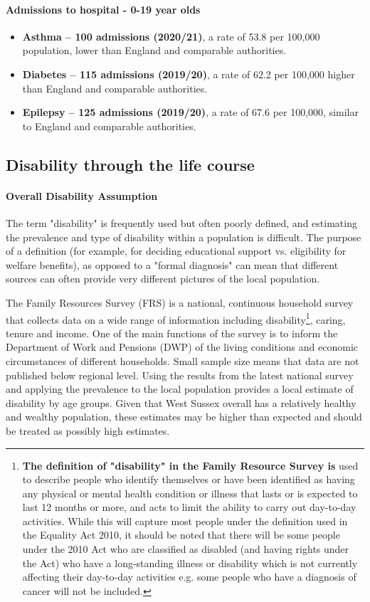 \paragraph{Admissions to hospital - 0-19 year olds}
\begin{itemize}[noitemsep]
    \item {\bfseries Asthma -- 100 admissions (2020/21)}, a rate of 53.8 per 100,000 population, lower than England and comparable authorities.
    \item {\bfseries Diabetes -- 115 admissions (2019/20)}, a rate of 62.2 per 100,000 higher than England and comparable authorities.
    \item {\bfseries Epilepsy -- 125 admissions (2019/20)}, a rate of 67.6 per 100,000, similar to England and comparable authorities.
\end{itemize}

\subsection{Disability through the life course}
\paragraph{Overall Disability Assumption} The term "disability" is frequently used but often poorly defined, and estimating the prevalence and type of disability within a population is difficult. The purpose of a definition (for example, for deciding educational support vs. eligibility for welfare benefits), as opposed to a "formal diagnosis" can mean that different sources can often provide very different pictures of the local population.

The Family Resources Survey (FRS) is a national, continuous household survey that collects data on a wide range of information including disability\footnote{{\bf The definition of "disability" in the Family Resource Survey is} used to describe people who identify themselves or have been identified as having any physical or mental health condition or illness that lasts or is expected to last 12 months or more, and acts to limit the ability to carry out day-to-day activities. While this will capture most people under the definition used in the Equality Act 2010, it should be noted that there will be some people under the 2010 Act who are classified as disabled (and having rights under the Act) who have a long-standing illness or disability which is not currently affecting their day-to-day activities e.g. some people who have a diagnosis of cancer will not be included.}, caring, tenure and income. One of the main functions of the survey is to inform the Department of Work and Pensions (DWP) of the living conditions and economic circumstances of different households. Small sample size means that data are not published below regional level. Using the results from the latest national survey and applying the prevalence to the local population provides a local estimate of disability by age groups. Given that West Sussex overall has a relatively healthy and wealthy population, these estimates may be higher than expected and should be treated as possibly high estimates.

